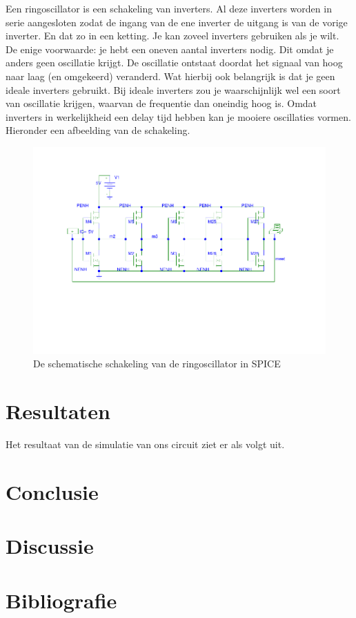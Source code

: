 \documentclass{scrartcl}  %
\begin{document}
Een ringoscillator is een schakeling van inverters. Al deze inverters worden in serie aangesloten zodat de ingang van de ene inverter de uitgang is van de vorige inverter. En dat zo in een ketting. Je kan zoveel inverters gebruiken als je wilt. De enige voorwaarde: je hebt een oneven aantal inverters nodig. Dit omdat je anders geen oscillatie krijgt. De oscillatie ontstaat doordat het signaal van hoog naar laag (en omgekeerd) veranderd. Wat hierbij ook belangrijk is dat je geen ideale inverters gebruikt. Bij ideale inverters zou je waarschijnlijk wel een soort van oscillatie krijgen, waarvan de frequentie dan oneindig hoog is. Omdat inverters in werkelijkheid een delay tijd hebben kan je mooiere oscillaties vormen. Hieronder een afbeelding van de schakeling.
\begin{figure}[H]
\centering
	
	\includegraphics[width=\linewidth]{images/ringoscillatorg-rc.pdf}
	\caption{De schematische schakeling van de ringoscillator in SPICE}
	\label{fig:Id}
\end{figure}
\section{Resultaten}
Het resultaat van de simulatie van ons circuit ziet er als volgt uit.
\section{Conclusie}


\section{Discussie}


\newpage
{}
\section{Bibliografie}
\printbibliography
\end{document}
